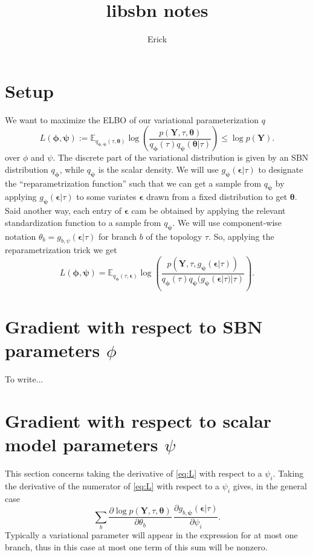 \documentclass{article}
\title{libsbn notes}
\author{Erick}
\begin{document}


\section*{Setup}
We want to maximize the ELBO of our variational parameterization $q$
\[
L(\bm{\phi},{\bm{\psi}}) :=
\mathbb{E}_{q_{\bm{\phi},{\bm{\psi}}}(\tau, \bm{\theta})}
\log\left(
    \frac{p(\bm{Y}, \tau, \bm{\theta})}
    {q_{\bm{\phi}}(\tau)q_{\bm{\psi}}(\bm{\theta}|\tau)}
\right) \leq \log p(\bm{Y}).
\]
over $\phi$ and $\psi$.
The discrete part of the variational distribution is given by an SBN distribution $q_{\bm\phi}$, while $q_{\bm\psi}$ is the scalar density.
We will use $g_{\bm{\psi}}(\bm{\epsilon}|\tau)$ to designate the ``reparametrization function'' such that we can get a sample from $q_{\bm\psi}$ by applying $g_{\bm{\psi}}(\bm{\epsilon}|\tau)$ to some variates $\bm\epsilon$ drawn from a fixed distribution to get $\bm\theta$.
Said another way, each entry of $\bm{\epsilon}$ cam be obtained by applying the relevant standardization function to a sample from $q_{\bm\psi}$.
We will use component-wise notation $\theta_b = g_{b, \psi}(\bm\epsilon|\tau)$ for branch $b$ of the topology $\tau$.
So, applying the reparametrization trick we get
\begin{equation}
L(\bm{\phi},{\bm{\psi}}) = \mathbb{E}_{
    q_{\bm{\phi}}(\tau,\bm{\epsilon})}
    \log\left(
        \frac
        {p(\bm{Y},\tau,g_{\bm{\psi}}(\bm{\epsilon}|\tau))}
        {q_{\bm{\phi}}(\tau)q_{\bm{\psi}}(g_{\bm{\psi}}(\bm{\epsilon}|\tau)|\tau)}
    \right).
\label{eq:L}
\end{equation}

\section*{Gradient with respect to SBN parameters $\phi$}

To write...

\section*{Gradient with respect to scalar model parameters $\psi$}

This section concerns taking the derivative of \eqref{eq:L} with respect to a $\psi_i$.
Taking the derivative of the numerator of \eqref{eq:L} with respect to a $\psi_i$ gives, in the general case
\begin{equation}
    \sum_b
    \frac{\partial \log p(\bm{Y} , \tau, \bm\theta)}{\partial \theta_b} \,
    \frac{\partial g_{b,\bm\psi}(\bm\epsilon | \tau)}{\partial \psi_i}.
    \label{eq:dlogpdPsi}
\end{equation}
Typically a variational parameter will appear in the expression for at most one branch, thus in this case at most one term of this sum will be nonzero.
\end{document}
